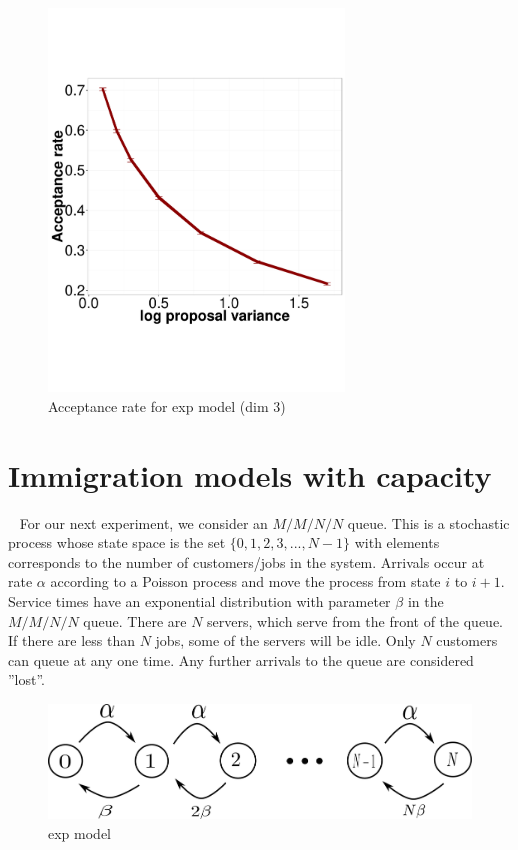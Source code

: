   \begin{figure}%
  \centering
  \begin{minipage}[hp]{0.45\linewidth}
  \centering
    \includegraphics [width=0.70\textwidth, angle=0]{figs/acc_rate_exp_d3.pdf}
    \caption{Acceptance rate for exp model (dim 3)}
      \end{minipage}
  \end{figure}


\section{Immigration models with capacity}~
For our next experiment, we consider an $M/M/N/N$ queue. This is a stochastic process whose state space is the set $\{0, 1, 2, 3, ..., N - 1\}$ with elements
corresponds to the number of customers/jobs in the system. Arrivals occur at rate $\alpha$ according to a Poisson process and move the process from state $i$ to $i+1$. 
Service times have an exponential distribution with parameter $\beta$ in the $M/M/N/N$ queue. There are $N$ servers, which serve from the front of the queue. 
If there are less than $N$ jobs, some of the servers will be idle. Only $N$ customers can queue at any one time. Any further arrivals to the queue are considered 
''lost''. 
  \begin{figure}[H]
  \centering
  \begin{minipage}[!hp]{0.6\linewidth}%
  \centering
    \includegraphics [width=1\textwidth, angle=0]{figs/queue_model.pdf}%
      \end{minipage}
    \caption{exp model}
  \end{figure}

